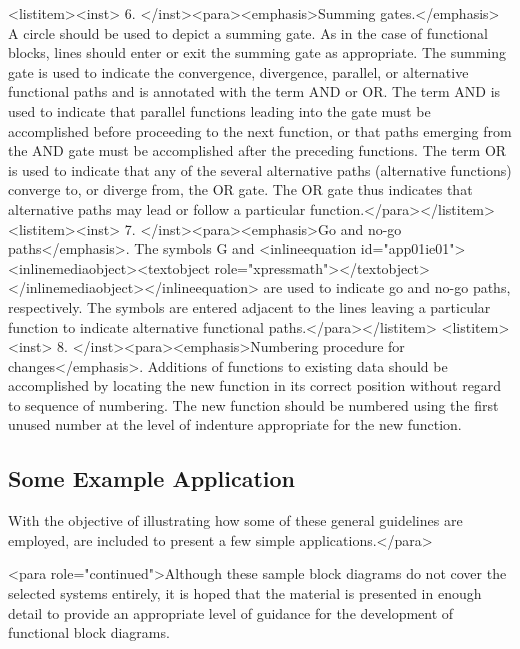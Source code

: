 <listitem><inst>	6.	</inst><para><emphasis>Summing gates.</emphasis> A circle should be used to depict a summing gate. As in the case of functional blocks, lines should enter or exit the summing gate as appropriate. The summing gate is used to indicate the convergence, divergence, parallel, or alternative functional paths and is annotated with the term AND or OR. The term AND is used to indicate that parallel functions leading into the gate must be accomplished before proceeding to the next function, or that paths emerging from the AND gate must be accomplished after the preceding functions. The term OR is used to indicate that any of the several alternative paths (alternative functions) converge to, or diverge from, the OR gate. The OR gate thus indicates that alternative paths may lead or follow a particular function.</para></listitem>
<listitem><inst>	7.	</inst><para><emphasis>Go and no-go paths</emphasis>. The symbols G and <inlineequation id="app01ie01"><inlinemediaobject><textobject role="xpressmath"></textobject></inlinemediaobject></inlineequation> are used to indicate go and no-go paths, respectively. The symbols are entered adjacent to the lines leaving a particular function to indicate alternative functional paths.</para></listitem>
<listitem><inst>	8.	</inst><para><emphasis>Numbering procedure for changes</emphasis>. Additions of functions to existing data should be accomplished by locating the new function in its correct position without regard to sequence of numbering. The new function should be numbered using the first unused number at the level of indenture appropriate for the new function.

\subsection{Some Example Application}

With the objective of illustrating how some of these general guidelines are employed, are included to present a few simple applications.</para>

<para role="continued">Although these sample block diagrams do not cover the selected systems entirely, it is hoped that the material is presented in enough detail to provide an appropriate level of guidance for the development of functional block diagrams.